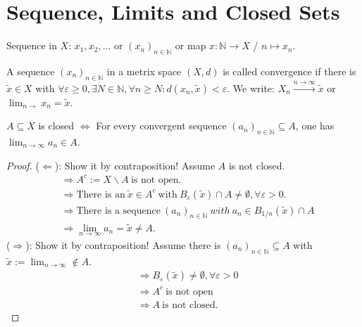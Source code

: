\documentclass[../../note.tex]{subfiles}
\begin{document}
\section{Sequence, Limits and Closed Sets}
\begin{definition}[Sequence]
    Sequence in $X$: $x_1,x_2,\dots$ or $(x_n)_{n \in \mathbb{N}}$ or map $x: \mathbb{N} \rightarrow X$ / $n \mapsto x_n$.
\end{definition}

\begin{definition}[Convergence]
    A sequence $(x_n)_{n \in \mathbb{N}}$ in a metrix space $(X,d)$ is called convergence if there is $\tilde{x} \in X$ with $\forall \varepsilon \geq 0, \exists N \in \mathbb{N}, \forall n \geq N: d(x_n, \tilde{x}) < {\varepsilon}$. We write: $X_n \stackrel{n \rightarrow \infty}{\longrightarrow} \tilde{x}$ or $\lim_{n \rightarrow} x_n = \tilde{x}$.
\end{definition}

\begin{proposition}
    $A \subseteq X$ is closed $\Longleftrightarrow$ For every convergent sequence $(a_n)_{n \in \mathbb{N}} \subseteq A$, one has $\lim_{n \rightarrow \infty} a_n \in A$.
\end{proposition}
\begin{proof}
    ($\Longleftarrow$): Show it by contraposition! Assume $A$ is not closed.
    \begin{align}
        &\Longrightarrow A^c:= X \backslash A~\textrm{is not open.} \\
        &\Longrightarrow \textrm{There is an}~\tilde{x} \in A^c~\textrm{with}~B_{\varepsilon}(\tilde{x}) \cap A \neq \emptyset, \forall \varepsilon >0. \\
        &\Longrightarrow \textrm{There is a sequence}~(a_n)_{n \in \mathbb{N}}~with~a_n \in B_{1/n}(\tilde{x}) \cap A \\
        &\Longrightarrow \lim_{n \rightarrow \infty} a_n = \tilde{x} \neq A.
    \end{align}
    ($\Longrightarrow$): Show it by contraposition! Assume there is $(a_n)_{n \in \mathbb{N}} \subseteq A$ with $\tilde{x}:= \lim_{n \rightarrow \infty} \notin A$.
    \begin{align}
        &\Longrightarrow B_{\varepsilon}(\tilde{x}) \neq \emptyset, \forall \varepsilon >0 \\
        &\Longrightarrow A^c~\textrm{is not open} \\
        &\Longrightarrow A~\textrm{is not closed}.
    \end{align}
\end{proof}
\end{document}
